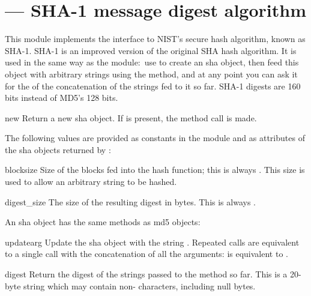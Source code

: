 \section{ ---
         SHA-1 message digest algorithm}



This module implements the interface to NIST's secure hash 
algorithm, known as SHA-1.  SHA-1 is an
improved version of the original SHA hash algorithm.  It is used in
the same way as the  module:\ use 
to create an sha object, then feed this object with arbitrary strings
using the  method, and at any point you can ask it
for the  of the concatenation of the strings fed to it
so far.  SHA-1 digests are 160 bits instead of
MD5's 128 bits.


\begin{funcdesc}{new}{}
  Return a new sha object.  If  is present, the method
  call  is made.
\end{funcdesc}


The following values are provided as constants in the module and as
attributes of the sha objects returned by :

\begin{datadesc}{blocksize}
  Size of the blocks fed into the hash function; this is always
  .  This size is used to allow an arbitrary string to be
  hashed.
\end{datadesc}

\begin{datadesc}{digest_size}
  The size of the resulting digest in bytes.  This is always
  .
\end{datadesc}


An sha object has the same methods as md5 objects:

\begin{methoddesc}[sha]{update}{arg}
Update the sha object with the string .  Repeated calls are
equivalent to a single call with the concatenation of all the
arguments:  is equivalent to
.
\end{methoddesc}

\begin{methoddesc}[sha]{digest}{}
Return the digest of the strings passed to the 
method so far.  This is a 20-byte string which may contain
non-\ASCII{} characters, including null bytes.
\end{methoddesc}

